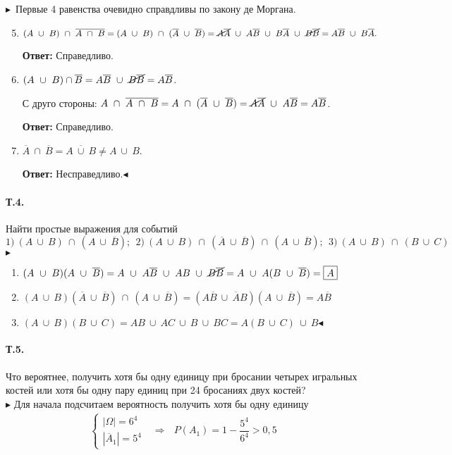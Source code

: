 \documentclass[a4paper,12pt]{article} %
\newcommand{\tb}[1]{\textbf{#1}}
\newcommand{\abs}[1]{\left|#1\right|}
\newcommand{\ol}[1]{\ensuremath{\overline{#1}}}
\begin{document}
\noindent$ \blacktriangleright $~Первые 4 равенства очевидно справдливы
по закону де Моргана. 
\begin{enumerate}
	\setcounter{enumi}{4}
	\item 
	$
		(A~\cup~B)~\cap~\ol{A~\cap~B}=
		(A~\cup~B)~\cap~(\ol{A}~\cup~\ol{B})=
		\cancel{A\ol{A}}~\cup~A\ol{B}~\cup~B\ol{A}~\cup~\cancel{B\ol{B}}=
		A\ol{B}~\cup~B\ol{A}.
	$
	
	\tb{Ответ: } Справедливо.
	\item $ (A~\cup~B)\cap\ol{B}=A\ol{B}~\cup~\cancel{B\ol{B}}=A\ol{B} $.
	
	С друго стороны: 
	$ A~\cap~\ol{A~\cap~B}=A~\cap~(\ol{A}~\cup~\ol{B})=
	\cancel{A\ol{A}}~\cup~A\ol{B}=A\ol{B} $.
	
	\tb{Ответ: } Справедливо.
	\item $ \ol{A}~\cap~\ol{B}=\ol{A~\cup~B}\ne A~\cup~B $.
	
	\tb{Ответ: } Несправедливо.\hfill$ \blacktriangleleft $
\end{enumerate}

\paragraph{Т.4.} Найти простые выражения для событий
\[
	1)~(A~\cup~B)~\cap~(A~\cup~\ol{B});~~
	2)~(A~\cup~B)~\cap~(\ol{A}~\cup~\ol{B})~\cap~(A~\cup~\ol{B});~~
	3)~(A~\cup~B)~\cap~(B~\cup~C)
\]
$ \blacktriangleright $
\begin{enumerate}
	\item $ (A~\cup~B)(A~\cup~\ol{B})=
	A~\cup~A\ol{B}~\cup~AB~\cup~\cancel{B\ol{B}}=
	A~\cup~A(B~\cup~\ol{B})=\boxed{A} $
	\item $ (A~\cup~B)(\ol{A}~\cup~\ol{B})~\cap~(A~\cup~\ol{B})=
	(A\ol{B}~\cup~\ol{A}B)(A~\cup~\ol{B})=\boxed{A\ol{B}}$
	\item $ (A~\cup~B)(B~\cup~C)=AB~\cup~AC~\cup~B~\cup~BC=
	\boxed{A(B~\cup~C)~\cup~B} $\hfill$ \blacktriangleleft $
\end{enumerate}

\paragraph{Т.5.} Что вероятнее, получить хотя бы одну единицу при
бросании четырех игральных костей или хотя бы одну пару единиц при 
24 бросаниях двух костей?\\

\noindent$ \blacktriangleright $ Для начала подсчитаем вероятность получить
хотя бы одну единицу
\begin{align}
	\begin{cases}
		\abs{\Omega}=6^4\\
		\abs{\ol{A}_1}=5^4
	\end{cases}~~~\Longrightarrow~~~P(A_1)=
	1-\dfrac{5^4}{6^4}>0,5
\end{align}
\end{document}

